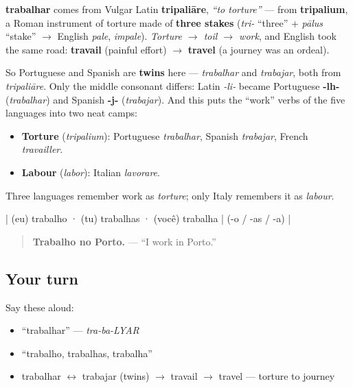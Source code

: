 \begin{cousinweb}
\textbf{trabalhar} comes from Vulgar Latin \textbf{tripaliāre}, \emph{\textquotedblleft{}to torture\textquotedblright{}} — from \textbf{tripalium}, a Roman instrument of torture made of \textbf{three stakes} (\emph{tri-} \textquotedblleft{}three\textquotedblright{} + \emph{pālus} \textquotedblleft{}stake\textquotedblright{} $\to$ English \emph{pale}, \emph{impale}). \emph{Torture $\to$ toil $\to$ work}, and English took the same road: \textbf{travail} (painful effort) $\to$ \textbf{travel} (a journey was an ordeal).

So Portuguese and Spanish are \textbf{twins} here — \emph{trabalhar} and \emph{trabajar}, both from \emph{tripaliāre}. Only the middle consonant differs: Latin \emph{-li-} became Portuguese \textbf{-lh-} (\emph{trabalhar}) and Spanish \textbf{-j-} (\emph{trabajar}). And this puts the \textquotedblleft{}work\textquotedblright{} verbs of the five languages into two neat camps:

\begin{itemize}
\raggedright
  \item \textbf{Torture} (\emph{tripalium}): Portuguese \emph{trabalhar}, Spanish \emph{trabajar}, French \emph{travailler}.
  \item \textbf{Labour} (\emph{labor}): Italian \emph{lavorare}.
\end{itemize}

Three languages remember work as \emph{torture}; only Italy remembers it as \emph{labour}.
\end{cousinweb}

\begin{grammarlens}[title={Grammar Lens: same -ar template}]
| (eu) trabalho · (tu) trabalhas · (você) trabalha | (-o / -as / -a) |

\begin{quote}
\textbf{Trabalho no Porto.} — \textquotedblleft{}I work in Porto.\textquotedblright{}
\end{quote}
\end{grammarlens}

\subsection*{Your turn}
Say these aloud:

\begin{itemize}
\raggedright
  \item \textquotedblleft{}trabalhar\textquotedblright{} — \emph{tra-ba-LYAR}
  \item \textquotedblleft{}trabalho, trabalhas, trabalha\textquotedblright{}
  \item trabalhar $\leftrightarrow$ trabajar (twins) $\to$ travail $\to$ travel — torture to journey
\end{itemize}

